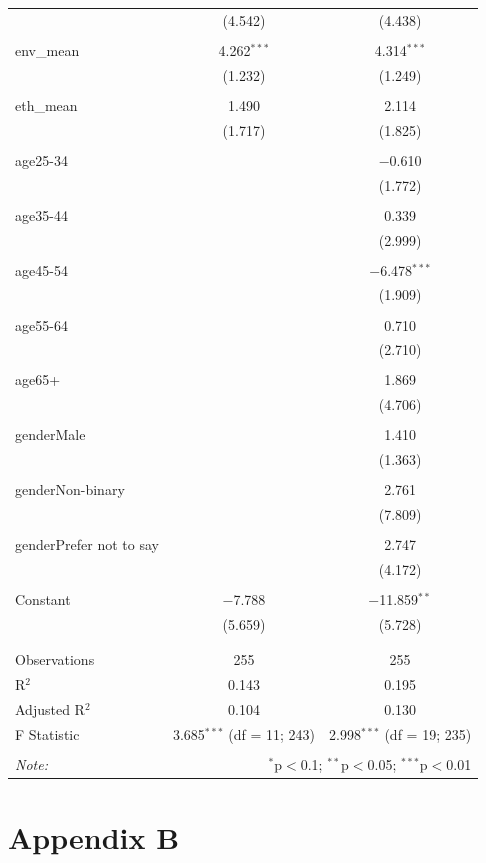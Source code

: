 \documentclass[
]{article}
\begin{document}
\begin{table}[!htbp]
\begin{tabular}{@{\extracolsep{5pt}}lcc}
  & (4.542) & (4.438) \\ 
  & & \\ 
 env\_mean & 4.262$^{***}$ & 4.314$^{***}$ \\ 
  & (1.232) & (1.249) \\ 
  & & \\ 
 eth\_mean & 1.490 & 2.114 \\ 
  & (1.717) & (1.825) \\ 
  & & \\ 
 age25-34 &  & $-$0.610 \\ 
  &  & (1.772) \\ 
  & & \\ 
 age35-44 &  & 0.339 \\ 
  &  & (2.999) \\ 
  & & \\ 
 age45-54 &  & $-$6.478$^{***}$ \\ 
  &  & (1.909) \\ 
  & & \\ 
 age55-64 &  & 0.710 \\ 
  &  & (2.710) \\ 
  & & \\ 
 age65+ &  & 1.869 \\ 
  &  & (4.706) \\ 
  & & \\ 
 genderMale &  & 1.410 \\ 
  &  & (1.363) \\ 
  & & \\ 
 genderNon-binary &  & 2.761 \\ 
  &  & (7.809) \\ 
  & & \\ 
 genderPrefer not to say &  & 2.747 \\ 
  &  & (4.172) \\ 
  & & \\ 
 Constant & $-$7.788 & $-$11.859$^{**}$ \\ 
  & (5.659) & (5.728) \\ 
  & & \\ 
\hline \\[-1.8ex] 
Observations & 255 & 255 \\ 
R$^{2}$ & 0.143 & 0.195 \\ 
Adjusted R$^{2}$ & 0.104 & 0.130 \\ 
F Statistic & 3.685$^{***}$ (df = 11; 243) & 2.998$^{***}$ (df = 19; 235) \\ 
\hline 
\hline \\[-1.8ex] 
\textit{Note:}  & \multicolumn{2}{r}{$^{*}$p$<$0.1; $^{**}$p$<$0.05; $^{***}$p$<$0.01} \\ 
\end{tabular} 
\end{table}

\newpage

\hypertarget{appendix-b}{%
\section{Appendix B}\label{appendix-b}}


\end{document}
